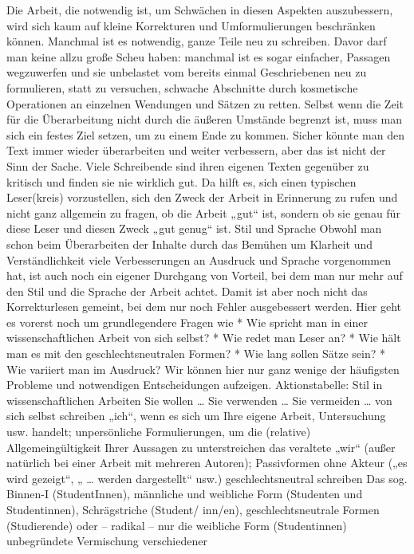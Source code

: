 \documentclass[]{book}
\theoremstyle{definition}
\theoremstyle{definition}
\theoremstyle{definition}
\theoremstyle{remark}
\begin{document}
Die Arbeit, die notwendig ist, um Schwächen in diesen Aspekten
auszubessern, wird sich kaum auf kleine Korrekturen und Umformulierungen
beschränken können. Manchmal ist es notwendig, ganze Teile neu zu
schreiben. Davor darf man keine allzu große Scheu haben: manchmal ist es
sogar einfacher, Passagen wegzuwerfen und sie unbelastet vom bereits
einmal Geschriebenen neu zu formulieren, statt zu versuchen, schwache
Abschnitte durch kosmetische Operationen an einzelnen Wendungen und
Sätzen zu retten. Selbst wenn die Zeit für die Überarbeitung nicht durch
die äußeren Umstände begrenzt ist, muss man sich ein festes Ziel setzen,
um zu einem Ende zu kommen. Sicher könnte man den Text immer wieder
überarbeiten und weiter verbessern, aber das ist nicht der Sinn der
Sache. Viele Schreibende sind ihren eigenen Texten gegenüber zu kritisch
und finden sie nie wirklich gut. Da hilft es, sich einen typischen
Leser(kreis) vorzustellen, sich den Zweck der Arbeit in Erinnerung zu
rufen und nicht ganz allgemein zu fragen, ob die Arbeit „gut`` ist,
sondern ob sie genau für diese Leser und diesen Zweck „gut genug`` ist.
Stil und Sprache Obwohl man schon beim Überarbeiten der Inhalte durch
das Bemühen um Klarheit und Verständlichkeit viele Verbesserungen an
Ausdruck und Sprache vorgenommen hat, ist auch noch ein eigener
Durchgang von Vorteil, bei dem man nur mehr auf den Stil und die Sprache
der Arbeit achtet. Damit ist aber noch nicht das Korrekturlesen gemeint,
bei dem nur noch Fehler ausgebessert werden. Hier geht es vorerst noch
um grundlegendere Fragen wie * Wie spricht man in einer
wissenschaftlichen Arbeit von sich selbst? * Wie redet man Leser an? *
Wie hält man es mit den geschlechtsneutralen Formen? * Wie lang sollen
Sätze sein? * Wie variiert man im Ausdruck? Wir können hier nur ganz
wenige der häufigsten Probleme und notwendigen Entscheidungen aufzeigen.
Aktionstabelle: Stil in wissenschaftlichen Arbeiten Sie wollen \ldots{}
Sie verwenden \ldots{} Sie vermeiden \ldots{} von sich selbst schreiben
„ich``, wenn es sich um Ihre eigene Arbeit, Untersuchung usw. handelt;
unpersönliche Formulierungen, um die (relative) Allgemeingültigkeit
Ihrer Aussagen zu unterstreichen das veraltete „wir`` (außer natürlich
bei einer Arbeit mit mehreren Autoren); Passivformen ohne Akteur („es
wird gezeigt``, „ \ldots{} werden dargestellt`` usw.) geschlechtsneutral
schreiben Das sog. Binnen-I (StudentInnen), männliche und weibliche Form
(Studenten und Studentinnen), Schrägstriche (Student/ inn/en),
geschlechtsneutrale Formen (Studierende) oder -- radikal -- nur die
weibliche Form (Studentinnen) unbegründete Vermischung verschiedener
\end{document}
